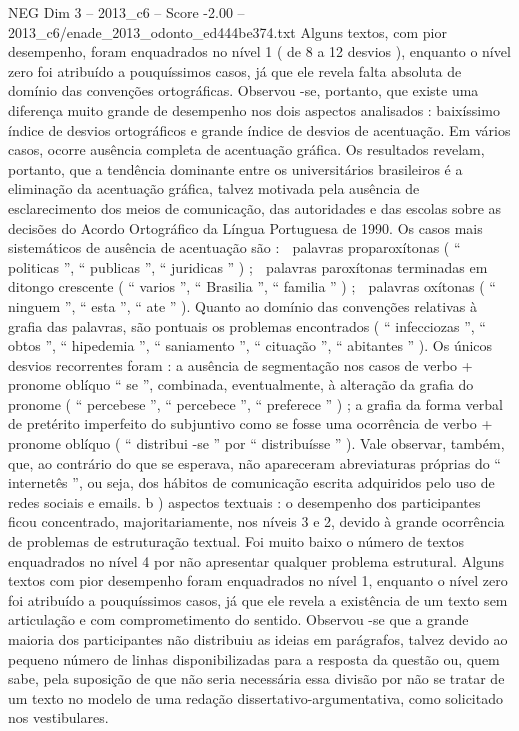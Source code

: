 \begin{textsample}{NEG Dim 3 – 2013\_c6 – Score -2.00 – 2013\_c6/enade\_2013\_odonto\_ed444be374.txt}
Alguns textos, com pior desempenho, foram enquadrados no nível 1 ( de 8 a 12 desvios ), enquanto o nível zero foi atribuído a pouquíssimos casos, já que ele revela falta absoluta de domínio das convenções ortográficas.
Observou -se, portanto, que existe uma diferença muito grande de desempenho nos dois aspectos analisados : baixíssimo índice de desvios ortográficos e grande índice de desvios de acentuação.
Em vários casos, ocorre ausência completa de acentuação gráfica.
Os resultados revelam, portanto, que a tendência dominante entre os universitários brasileiros é a eliminação da acentuação gráfica, talvez motivada pela ausência de esclarecimento dos meios de comunicação, das autoridades e das escolas sobre as decisões do Acordo Ortográfico da Língua Portuguesa de 1990.
Os casos mais sistemáticos de ausência de acentuação são :  palavras proparoxítonas ( “ politicas ”, “ publicas ”, “ juridicas ” ) ;  palavras paroxítonas terminadas em ditongo crescente ( “ varios ”, “ Brasilia ”, “ familia ” ) ;  palavras oxítonas ( “ ninguem ”, “ esta ”, “ ate ” ).
Quanto ao domínio das convenções relativas à grafia das palavras, são pontuais os problemas encontrados ( “ infecciozas ”, “ obtos ”, “ hipedemia ”, “ saniamento ”, “ cituação ”, “ abitantes ” ).
Os únicos desvios recorrentes foram : a ausência de segmentação nos casos de verbo + pronome oblíquo “ se ”, combinada, eventualmente, à alteração da grafia do pronome ( “ percebese ”, “ percebece ”, “ preferece ” ) ; a grafia da forma verbal de pretérito imperfeito do subjuntivo como se fosse uma ocorrência de verbo + pronome oblíquo ( “ distribui -se ” por “ distribuísse ” ).
Vale observar, também, que, ao contrário do que se esperava, não apareceram abreviaturas próprias do “ internetês ”, ou seja, dos hábitos de comunicação escrita adquiridos pelo uso de redes sociais e emails. b ) aspectos textuais : o desempenho dos participantes ficou concentrado, majoritariamente, nos níveis 3 e 2, devido à grande ocorrência de problemas de estruturação textual.
Foi muito baixo o número de textos enquadrados no nível 4 por não apresentar qualquer problema estrutural.
Alguns textos com pior desempenho foram enquadrados no nível 1, enquanto o nível zero foi atribuído a pouquíssimos casos, já que ele revela a existência de um texto sem articulação e com comprometimento do sentido.
Observou -se que a grande maioria dos participantes não distribuiu as ideias em parágrafos, talvez devido ao pequeno número de linhas disponibilizadas para a resposta da questão ou, quem sabe, pela suposição de que não seria necessária essa divisão por não se tratar de um texto no modelo de uma redação dissertativo-argumentativa, como solicitado nos vestibulares.

\end{textsample}
